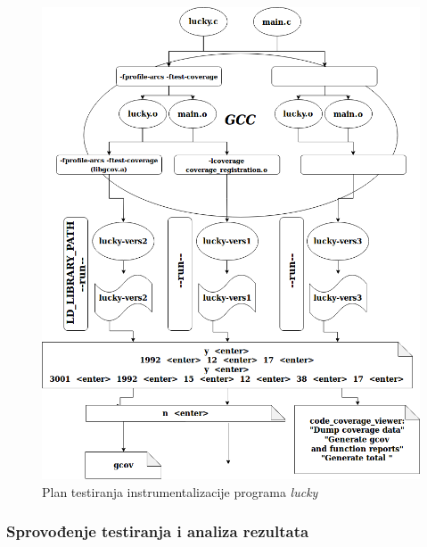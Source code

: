 \documentclass[12pt,oneside]{memoir}
\newcommand{\strano}[1]{\textit{#1}}
\begin{document}
\begin{figure}[!ht]
  \centering
  \includegraphics[width=\textwidth]{img/lucky_diagram.png}
  \caption{Plan testiranja instrumentalizacije programa \strano{lucky}}
  \label{fig:diag}
\end{figure}

\subsubsection{Sprovođenje testiranja i analiza rezultata}
\end{document}
